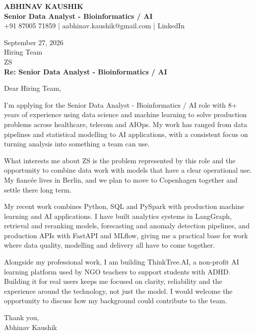 \documentclass[10pt,a4paper]{article}
\begin{document}
\begin{center}
{\Large\bfseries ABHINAV KAUSHIK}\\[2pt]
{\bfseries Senior Data Analyst - Bioinformatics / AI}\\[2pt]
+91 87005 71859 \quad | \quad aabhinav.kaushik@gmail.com \quad | \quad LinkedIn
\end{center}
\vspace{8pt}
September 27, 2026\\[6pt]
Hiring Team\\
ZS\\[4pt]
\textbf{Re: Senior Data Analyst - Bioinformatics / AI}

Dear Hiring Team,

I’m applying for the Senior Data Analyst - Bioinformatics / AI role with 8+ years of experience using data science and machine learning to solve production problems across healthcare, telecom and AIOps. My work has ranged from data pipelines and statistical modelling to AI applications, with a consistent focus on turning analysis into something a team can use.

What interests me about ZS is the problem represented by this role and the opportunity to combine data work with models that have a clear operational use. My fiancée lives in Berlin, and we plan to move to Copenhagen together and settle there long term.

My recent work combines Python, SQL and PySpark with production machine learning and AI applications. I have built analytics systems in LangGraph, retrieval and reranking models, forecasting and anomaly detection pipelines, and production APIs with FastAPI and MLflow, giving me a practical base for work where data quality, modelling and delivery all have to come together.

Alongside my professional work, I am building ThinkTree.AI, a non-profit AI learning platform used by NGO teachers to support students with ADHD. Building it for real users keeps me focused on clarity, reliability and the experience around the technology, not just the model. I would welcome the opportunity to discuss how my background could contribute to the team.

Thank you,\\
Abhinav Kaushik
\end{document}
